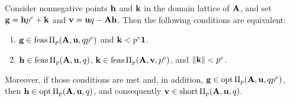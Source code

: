 \documentclass{amsart}
\begin{document}
\begin{lemma}
   \label{general AIP prep: L}
   Consider nonnegative points $\mathbf{h}$ and $\mathbf{k}$ in the domain lattice of $\mathbf{A}$, and set $\mathbf{g} = \mathbf{h} p^e + \mathbf{k}$ and $\mathbf{v} = \mathbf{u}q - \mathbf{A}\mathbf{h}$.
   Then the following conditions are equivalent\textup:
   \begin{enumerate}[$(1)$]
      \item $\mathbf{g} \in \operatorname{feas} \Pi_p(\mathbf{A},\mathbf{u},qp^e)$ and $\mathbf{k} < p^e \mathbf{1}$.
      \item $\mathbf{h} \in \operatorname{feas} \Pi_p(\mathbf{A},\mathbf{u},q)$, $\mathbf{k} \in \operatorname{feas} \Pi_p(\mathbf{A},\mathbf{v},p^e)$, and $\| \mathbf{k} \| < p^e$.
   \end{enumerate}
   Moreover, if those conditions are met and, in addition, $\mathbf{g}\in \operatorname{opt} \Pi_p(\mathbf{A},\mathbf{u},qp^e)$, then $\mathbf{h} \in \operatorname{opt} \Pi_p(\mathbf{A},\mathbf{u},q)$, and consequently $\mathbf{v} \in \operatorname{short} \Pi_p(\mathbf{A},\mathbf{u},q)$.
\end{lemma}
\end{document}
